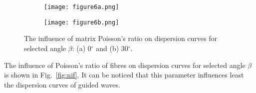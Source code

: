 \documentclass[preprint,12pt]{elsarticle}
\begin{document}
\begin{figure} [h!]
	\centering
	\begin{subfigure}[b]{0.49\textwidth}
		\centering
		\texttt{[image: figure6a.png]}
		\caption{}
		\label{fig:nim0}
	\end{subfigure}
	\hfill
	\begin{subfigure}[b]{0.49\textwidth}
		\centering
		\texttt{[image: figure6b.png]}
		\caption{}
		\label{fig:nim30}
	\end{subfigure}
	\caption{The influence of matrix Poisson's ratio on dispersion curves for selected 
	angle \(\beta\): (a) 0\(^{\circ}\) and (b) 30\(^{\circ}\).}
	\label{fig:nim}
\end{figure}

The influence of Poisson's ratio of fibres  on dispersion curves for selected angle 
\(\beta\) is shown in Fig.~\ref{fig:nif}. It can be noticed that this parameter influences 
least the dispersion curves of guided waves.
\end{document}
